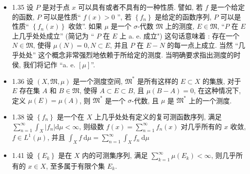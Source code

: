 \begin{itemize}
\item 1.35 设 $P$ 是对于点 $x$ 可以具有或者不具有的一种性质. 譬如, 若 $f$ 是一个给定的函数, $P$ 可以是性质“ $f(x)>0$ ”, 若 $\left\{f_{n}\right\}$ 是给定的函数序列, $P$ 可以是性质“ $\left\{f_{n}(x)\right\}$ 收敛”. 如果 $\mu$ 是一个 $\sigma$-代数 $\mathfrak{M}$ 上的测度, $E \in \mathfrak{M}$, “$P$ 在 $E$ 上几乎处处成立” (简记为 “ $P$ 在 $E$ 上 a. e. 成立") 这句话意味着 : 存在一个 $N \in \mathfrak{M}$, 使得 $\mu(N)=0, N \subset E$, 并且 $P$ 在 $E-N$ 的每一点上成立. 当然 “几乎处处” 这个概念非常强烈地依赖于所给定的测度. 当明确要求指出测度的时侯, 我们将记作 “a. e. $[\mu]$”.

\item 1.36 设 $(X, \mathfrak{M}, \mu)$ 是一个测度空间, $\mathfrak{M}^*$  是所有这样的 $E \subset X$ 的集族, 对于 $E$ 存在集 $A$ 和 $B \in \mathfrak{M}$, 使得 $A \subset E \subset B$, 且 $\mu(B-A)=0$, 在这种情况下, 定义 $\mu(E)=\mu(A)$, 则 $\mathfrak{M}^{*}$ 是一个 $\sigma$-代数, 且 $\mu$ 是 $\mathfrak{M}^{*}$ 上的一个测度.

\item 1.38 设 $\left\{f_{n}\right\}$ 是一个在 $X$ 上几乎处处有定义的复可测函数序列, 满足 $\sum_{n=1}^{\infty} \int_{X}\left|f_{n}\right| \mathrm{d} \mu<\infty$, 则级数 $f(x)=\sum_{n=1}^{\infty} f_{n}(x)$ 对几乎所有的 $x$ 收敛, $f \in L^{1}(\mu)$, 并且 $\int_{X} f \mathrm{~d} \mu=\sum_{n=1}^{\infty} \int_{X} f_{n} \mathrm{~d} \mu$

\item 1.41 设 $\left\{E_{k}\right\}$ 是在 $X$ 内的可测集序列, 满足 $\sum_{k=1}^{\infty} \mu\left(E_{k}\right)<\infty$, 则几乎所有的 $x \in X$, 至多属于有限个集 $E_{k}$.
\end{itemize}

